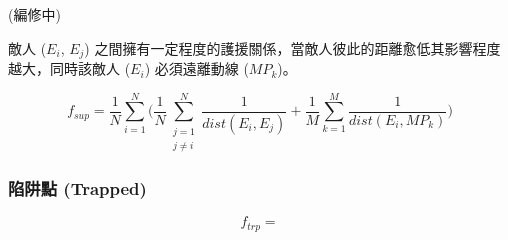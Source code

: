 (編修中)

敵人 ($E_{i}$, $E_{j}$) 之間擁有一定程度的護援關係，當敵人彼此的距離愈低其影響程度越大，同時該敵人 ($E_{i}$) 必須遠離動線 ($MP_{k}$)。

\begin{equation}
f_{sup}=\frac{1}{N} \sum_{i=1}^{N} \bigg( \frac{1}{N} \sum_{\substack{j=1 \\ j \neq i}}^{N} \frac{1}{dist(E_{i}, E_{j})} + \frac{1}{M} \sum_{k=1}^{M} \frac{1}{dist(E_{i}, MP_{k})} \bigg)
\end{equation}

\subsubsection{陷阱點 (Trapped)}
\label{sssec:method-segments-fitnesses-trapped}


\begin{equation}
    f_{trp} = 
\end{equation}









